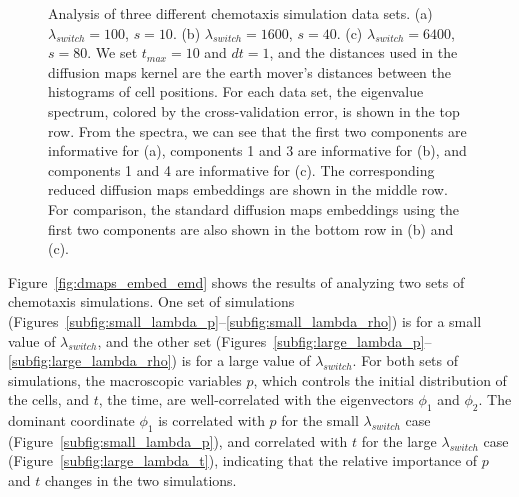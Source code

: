 \begin{figure}[t]
\begin{subfigure}[t]{2in}
\caption{}
\end{subfigure}
%
\caption[Changes in diffusion maps eigenspectra for chemotaxis simulation data]{Analysis of three different chemotaxis simulation data sets. (a) $\lambda_{switch} = 100$, $s = 10$. (b) $\lambda_{switch} = 1600$, $s = 40$. (c) $\lambda_{switch} = 6400$, $s = 80$. We set $t_{max} = 10$ and $dt=1$, and the distances used in the diffusion maps kernel are the earth mover's distances between the histograms of cell positions. For each data set, the eigenvalue spectrum, colored by the cross-validation error, is shown in the top row. From the spectra, we can see that the first two components are informative for (a), components 1 and 3 are informative for (b), and components 1 and 4 are informative for (c). The corresponding reduced diffusion maps embeddings are shown in the middle row. For comparison, the standard diffusion maps embeddings using the first two components are also shown in the bottom row in (b) and (c).}
%
\label{fig:chemotaxis_simulations_harmonics}
\end{figure}

Figure~\ref{fig:dmaps_embed_emd} shows the results of analyzing two sets of chemotaxis simulations.
%
One set of simulations (Figures~\ref{subfig:small_lambda_p}--\ref{subfig:small_lambda_rho}) is for a small value of $\lambda_{switch}$, and the other set (Figures~\ref{subfig:large_lambda_p}--\ref{subfig:large_lambda_rho}) is for a large value of $\lambda_{switch}$.
%
For both sets of simulations, the macroscopic variables $p$, which controls the initial distribution of the cells, and $t$, the time, are well-correlated with the eigenvectors $\phi_1$ and $\phi_2$.
%
%
The dominant coordinate $\phi_1$ is correlated with $p$ for the small $\lambda_{switch}$ case (Figure~\ref{subfig:small_lambda_p}), and correlated with $t$ for the large $\lambda_{switch}$ case (Figure~\ref{subfig:large_lambda_t}), indicating that the relative importance of $p$ and $t$ changes in the two simulations.
%

